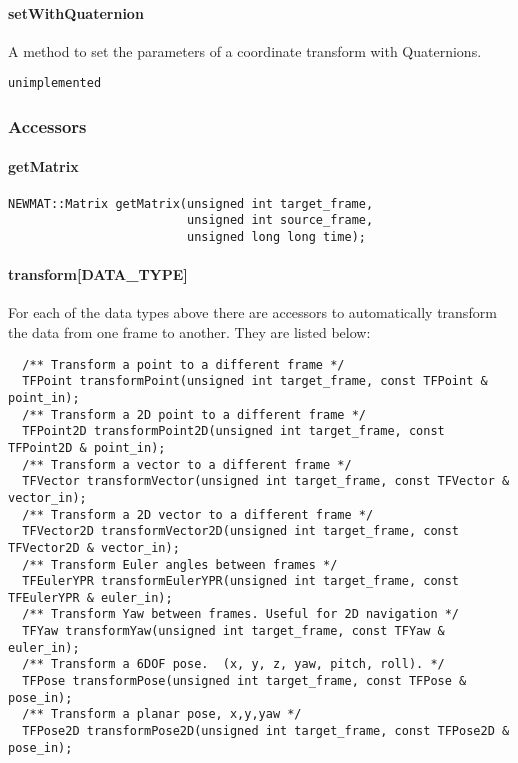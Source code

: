 \documentclass[12pt]{article}
\begin{document}
\paragraph{setWithQuaternion}
A method to set the parameters of a coordinate transform with Quaternions. 
\begin{verbatim}
unimplemented
\end{verbatim}


\subsubsection{Accessors}
\label{libTFAPI accessors}
\paragraph{getMatrix}
\begin{verbatim}
NEWMAT::Matrix getMatrix(unsigned int target_frame,
                         unsigned int source_frame,
                         unsigned long long time); 
\end{verbatim}

\paragraph{transform[DATA\_TYPE]}
For each of the data types above there are accessors to automatically
transform the data from one frame to another. They are listed below:
\begin{verbatim}
  /** Transform a point to a different frame */
  TFPoint transformPoint(unsigned int target_frame, const TFPoint & point_in);
  /** Transform a 2D point to a different frame */
  TFPoint2D transformPoint2D(unsigned int target_frame, const TFPoint2D & point_in);
  /** Transform a vector to a different frame */
  TFVector transformVector(unsigned int target_frame, const TFVector & vector_in);
  /** Transform a 2D vector to a different frame */
  TFVector2D transformVector2D(unsigned int target_frame, const TFVector2D & vector_in);
  /** Transform Euler angles between frames */
  TFEulerYPR transformEulerYPR(unsigned int target_frame, const TFEulerYPR & euler_in);
  /** Transform Yaw between frames. Useful for 2D navigation */
  TFYaw transformYaw(unsigned int target_frame, const TFYaw & euler_in);
  /** Transform a 6DOF pose.  (x, y, z, yaw, pitch, roll). */
  TFPose transformPose(unsigned int target_frame, const TFPose & pose_in);
  /** Transform a planar pose, x,y,yaw */
  TFPose2D transformPose2D(unsigned int target_frame, const TFPose2D & pose_in);
\end{verbatim}
\end{document}
